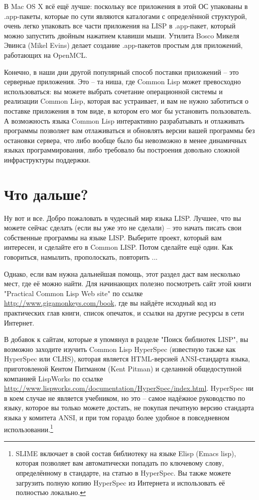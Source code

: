 В Mac OS X всё ещё лучше: поскольку все приложения в этой ОС упакованы в .app-пакеты,
которые по сути являются каталогами с определённой структурой, очень легко упаковать все
части приложения на LISP в .app-пакет, который можно запустить двойным нажатием клавиши
мыши. Утилита Bosco Микеля Эвинса (Mikel Evins) делает создание .app-пакетов простым для
приложений, работающих на OpenMCL.

Конечно, в наши дни другой популярный способ поставки приложений -- это серверные
приложения. Это -- та ниша, где Common Lisp может превосходно использоваться: вы можете
выбрать сочетание операционной системы и реализации Common Lisp, которая вас устраивает, и
вам не нужно заботиться о поставке приложения в том виде, в котором его мог бы установить
пользователь. А возможность языка Common Lisp интерактивно разрабатывать и отлаживать
программы позволяет вам отлаживаться и обновлять версии вашей программы без остановки
сервера, что либо вообще было бы невозможно в менее динамичных языках программирования,
либо требовало бы построения довольно сложной инфраструктуры поддержки.

\section{Что дальше?}

Ну вот и все. Добро пожаловать в чудесный мир языка LISP. Лучшее, что вы можете сейчас
сделать (если вы уже это не сделали) -- это начать писать свои собственные программы на
языке LISP. Выберите проект, который вам интересен, и сделайте его в Common LISP. Потом
сделайте ещё один. Как говориться, намылить, прополоскать, повторить ...

Однако, если вам нужна дальнейшая помощь, этот раздел даст вам несколько мест, где её
можно найти. Для начинающих полезно посмотреть сайт этой книги "Practical Common Lisp Web
site" по ссылке \url{http://www.gigamonkeys.com/book}, где вы найдёте исходный код из
практических глав книги, список опечаток, и ссылки на другие ресурсы в сети Интернет.

В добавок к сайтам, которые я упомянул в разделе "Поиск библиотек LISP", вы возможно
заходите изучить Common Lisp HyperSpec (известную также как HyperSpec или CLHS), которая
является HTML-версией ANSI-стандарта языка, приготовленой Кентом Питманом (Kent Pitman) и
сделанной общедоступной компанией LispWorks по ссылке
\url{http://www.lispworks.com/documentation/HyperSpec/index.html}. HyperSpec ни в коем
случае не является учебником, но это -- самое надёжное руководство по языку, которое вы
только можете достать, не покупая печатную версию стандарта языка у комитета ANSI, и при
том гораздо более удобное в повседневном использовании.\footnote{SLIME включает в свой
  состав библиотеку на языке Elisp (Emacs lisp), которая позволяет вам автоматически
  попадать по ключевому слову, определённому в стандарте, на статью в HyperSpec. Вы также
  можете загрузить полную копию HyperSpec из Интернета и использовать её полностью
  локально.}

